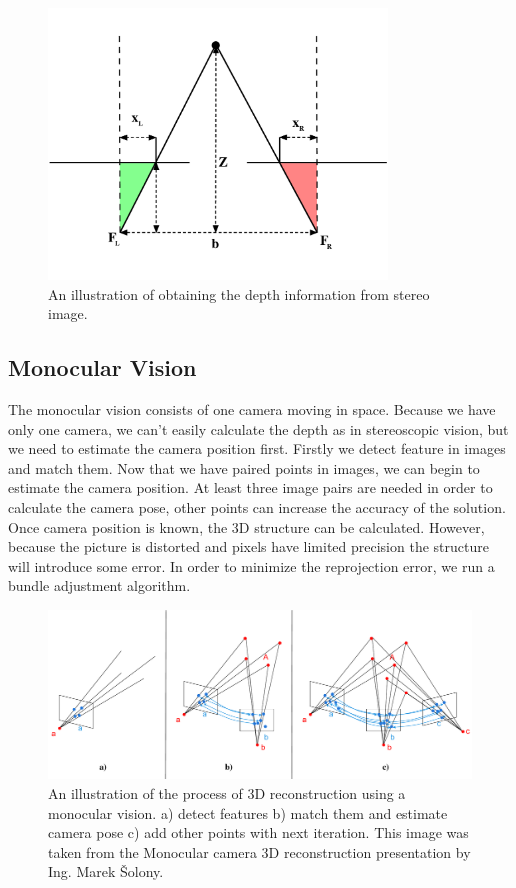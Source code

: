 \begin{figure}[ht]
	\begin{center}
		\includegraphics[keepaspectratio,width=9cm]{fig/stereo.pdf}
	\end{center}
	\caption{An illustration of obtaining the depth information from stereo image.}
	\label{fig:stereo}
\end{figure}

\subsection*{Monocular Vision}
The monocular vision consists of one camera moving in space. Because we have only one camera, we can't easily calculate the depth as in stereoscopic vision, but we need to estimate the camera position first. Firstly we detect feature in images and match them. Now that we have paired points in images, we can begin to estimate the camera position. At least three image pairs are needed in order to calculate the camera pose, other points can increase the accuracy of the solution. Once camera position is known, the 3D structure can be calculated. However, because the picture is distorted and pixels have limited precision the structure will introduce some error. In order to minimize the reprojection error, we run a bundle adjustment algorithm.

\begin{figure}[ht]
	\begin{center}
		\includegraphics[keepaspectratio,width=\textwidth]{fig/mono.pdf}
	\end{center}
	\caption{An illustration of the process of 3D reconstruction using a monocular vision. a) detect features b) match them and estimate camera pose c) add other points with next iteration. This image was taken from the Monocular camera 3D reconstruction presentation by Ing. Marek Šolony.}
	\label{fig:mono}
\end{figure}

